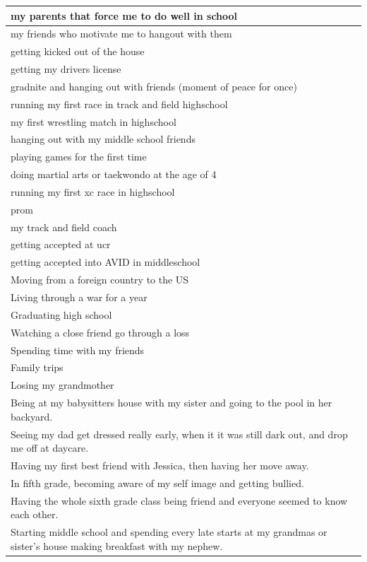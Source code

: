 \documentclass[
  .7em,
  letterpaper,
  DIV=11,
  numbers=noendperiod]{scrartcl}
\begin{document}
\begin{table}
\begin{tabular}{l}
\hline
my parents that force me to do well in school\\
\hline
my friends who motivate me to hangout with them\\
\hline
getting kicked out of the house\\
\hline
getting my drivers license\\
\hline
gradnite and hanging out with friends (moment of peace for once)\\
\hline
running my first race in track and field highschool\\
\hline
my first wrestling match in highschool\\
\hline
hanging out with my middle school friends\\
\hline
playing games for the first time\\
\hline
doing martial arts or taekwondo at the age of 4\\
\hline
running my first xc race in highschool\\
\hline
prom\\
\hline
my track and field coach\\
\hline
getting accepted at ucr\\
\hline
getting accepted into AVID in middleschool\\
\hline
Moving from a foreign country to the US\\
\hline
Living through a war for a year\\
\hline
Graduating high school\\
\hline
Watching a close friend go through a loss\\
\hline
Spending time with my friends\\
\hline
Family trips\\
\hline
Losing my grandmother\\
\hline
Being at my babysitters house with my sister and going to the pool in her backyard.\\
\hline
Seeing my dad get dressed really early, when it it was still dark out, and drop me off at daycare.\\
\hline
Having my first best friend with Jessica, then having her move away.\\
\hline
In fifth grade, becoming aware of my self image and getting bullied.\\
\hline
Having the whole sixth grade class being friend and everyone seemed to know each other.\\
\hline
Starting middle school and spending every late starts at my grandmas or sister's house making breakfast with my nephew.\\

\end{tabular}
\end{table}
\end{document}
